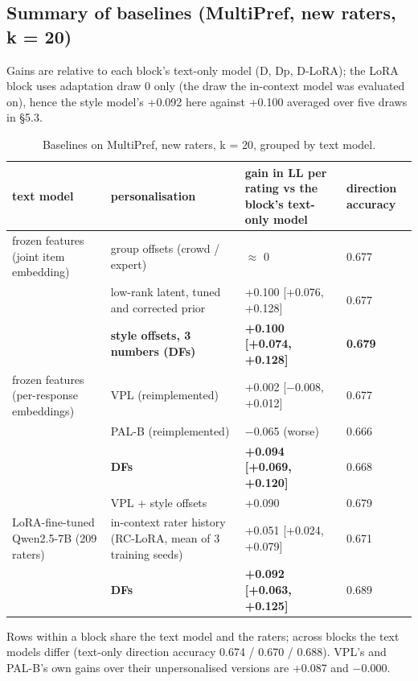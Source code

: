 \documentclass{article}
\begin{document}
\subsection{Summary of baselines (MultiPref, new raters, k = 20)}

Gains are relative to each block's text-only model (D, Dp, D-LoRA); the LoRA block uses adaptation draw 0 only (the draw the in-context model was evaluated on), hence the style model's +0.092 here against +0.100 averaged over five draws in \S{}5.3.

\begin{table}[t]\centering\caption{Baselines on MultiPref, new raters, k = 20, grouped by text model.}\scriptsize\setlength{\tabcolsep}{3pt}\begin{tabular}{@{}
  l
  l
  l
  l@{}}
\toprule\noalign{}
text model & personalisation & gain in LL per rating vs the block's text-only model & direction accuracy \\
\midrule\noalign{}



frozen features (joint item embedding) & group offsets (crowd / expert) & $\approx$ 0 & 0.677 \\
& low-rank latent, tuned and corrected prior & +0.100 {[}+0.076, +0.128{]} & 0.677 \\
& \textbf{style offsets, 3 numbers (DFs)} & \textbf{+0.100 {[}+0.074, +0.128{]}} & \textbf{0.679} \\
frozen features (per-response embeddings) & VPL (reimplemented) & +0.002 {[}$-$0.008, +0.012{]} & 0.677 \\
& PAL-B (reimplemented) & $-$0.065 (worse) & 0.666 \\
& \textbf{DFs} & \textbf{+0.094 {[}+0.069, +0.120{]}} & 0.668 \\
& VPL + style offsets & +0.090 & 0.679 \\
LoRA-fine-tuned Qwen2.5-7B (209 raters) & in-context rater history (RC-LoRA, mean of 3 training seeds) & +0.051 {[}+0.024, +0.079{]} & 0.671 \\
& \textbf{DFs} & \textbf{+0.092 {[}+0.063, +0.125{]}} & 0.689 \\
\bottomrule
\end{tabular}\end{table}

Rows within a block share the text model and the raters; across blocks the text models differ (text-only direction accuracy 0.674 / 0.670 / 0.688). VPL's and PAL-B's own gains over their unpersonalised versions are +0.087 and $-$0.000.
\end{document}
